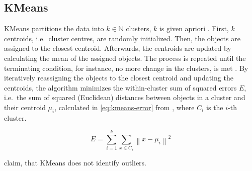 \subsection{KMeans}\label{subsec:kmeans}

KMeans partitions the data into $k \in \mathbb{N}$  clusters, $k$ is given apriori \cite{OPTICS_kMeans_2016,clusteringDocs2020}. %
First, $k$ centroids, i.e.\ cluster centres, are randomly initialized.
Then, the objects are assigned to the closest centroid.
Afterwards, the centroids are updated by calculating the mean of the assigned objects.
The process is repeated until the terminating condition, for instance, no more change in the clusters, is met \cite{OPTICS_kMeans_2016}.
By iteratively reassigning the objects to the closest centroid and updating the centroids, 
the algorithm minimizes the within-cluster sum of squared errors $E$, i.e.\ the sum of squared (Euclidean) distances between objects in a cluster and their centroid $\mu_{i}$, 
calculated in \autoref{eq:kmeans-error} from \cite{OPTICS_kMeans_2016}, 
where $C_{i}$ is the $i$-th cluster.

\begin{equation}
    E = \sum_{i=1}^{k} \sum_{x \in C_{i}}\left\|x-\mu_{i}\right\|^{2}
\label{eq:kmeans-error}
\end{equation}

\citeauthor{OPTICS_kMeans_2016} claim, that KMeans does not identify outliers.